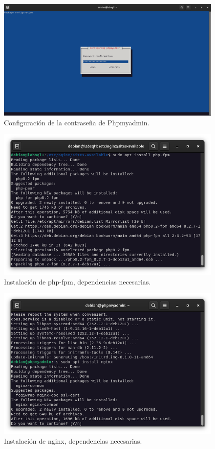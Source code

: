 \begin{figure}[H]
	\centering
	\includegraphics[scale=0.30]{01}
	\caption{Configuración de la contraseña de Phpmyadmin.}
\end{figure}

\begin{figure}[H]
	\centering
	\includegraphics[scale=0.30]{02}
	\caption{Instalación de php-fpm, dependencias necesarias.}
\end{figure}

\begin{figure}[H]
	\centering
	\includegraphics[scale=0.30]{03}
	\caption{Instalación de nginx, dependencias necesarias.}
\end{figure}

